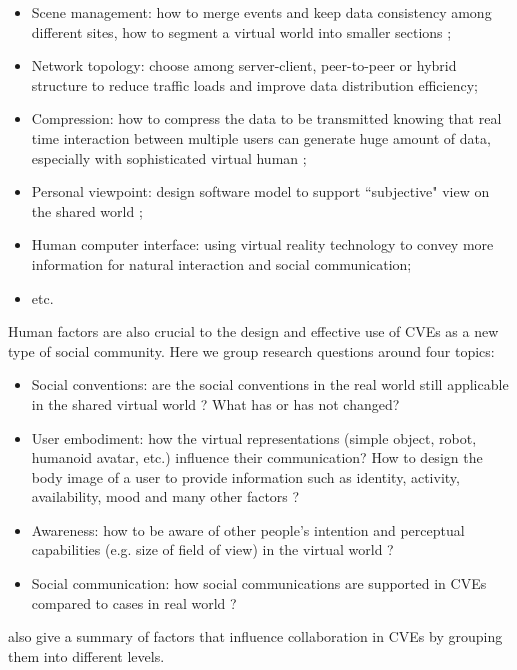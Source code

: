 \begin{itemize}
\item Scene management: how to merge events and keep data consistency among different sites, how to segment a virtual world into smaller sections \citep{Kazman1993Making};
\item Network topology: choose among server-client, peer-to-peer or hybrid structure to reduce traffic loads and improve data distribution efficiency;
\item Compression: how to compress the data to be transmitted knowing that real time interaction between multiple users can generate huge amount of data, especially with sophisticated virtual human \citep{Capin1998Efficient};
\item Personal viewpoint: design software model to support ``subjective" view on the shared world \citep{Smith1996CVE};
\item Human computer interface: using virtual reality technology to convey more information for natural interaction and social communication;
\item etc.
\end{itemize}

Human factors are also crucial to the design and effective use of CVEs as a new type of social community. Here we group research questions around four topics: 

\begin{itemize}
\item Social conventions: are the social conventions in the real world still applicable in the shared virtual world \citep{Becker1998Social}? What has or has not changed?
\item User embodiment: how the virtual representations (simple object, robot, humanoid avatar, etc.) influence their communication? How to design the body image of a user to provide information such as identity, activity, availability, mood and many other factors \citep{Benford1995Embodiment}? 
\item Awareness: how to be aware of other people's intention and perceptual capabilities (e.g. size of field of view) in the virtual world \citep{Benford1994Awareness}?
\item Social communication: how social communications are supported in CVEs compared to cases in real world \citep{Bailenson2006Long}?
\end{itemize}

\citet{Otto2006Review} also give a summary of factors that influence collaboration in CVEs by grouping them into different levels.


